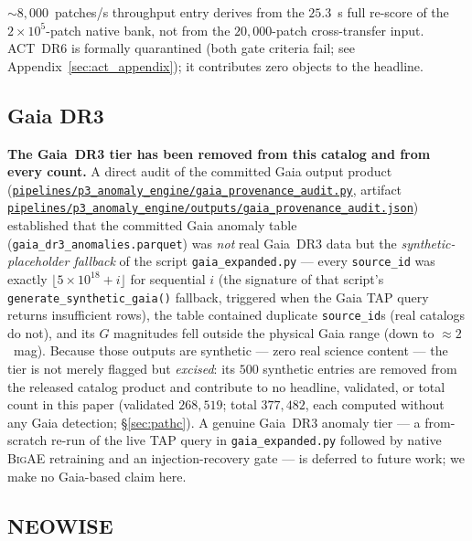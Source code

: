 \documentclass[aps,prd,twocolumn,superscriptaddress,showpacs,preprintnumbers,nofootinbib,longbibliography,floatfix]{revtex4-2}
\newcommand{\repoBase}{https://github.com/Hubify-Projects/bigbounce/blob/main}
\newcommand{\artifact}[1]{\href{\repoBase/#1}{\nolinkurl{#1}}}
\newcommand{\BigAE}{\textsc{BigAE}}
\begin{document}
${\sim}8{,}000$~patches/s throughput entry derives from the $25.3$~s full re-score of the $2\times10^{5}$-patch native bank, not from the $20{,}000$-patch cross-transfer input. ACT~DR6 is formally quarantined (both gate criteria fail; see Appendix~\ref{sec:act_appendix}); it contributes zero objects to the headline.


\subsection{Gaia DR3}\label{sec:gaia}

\textbf{The Gaia~DR3 tier has been removed from this catalog and from every count.} A direct audit of the committed Gaia output product (\artifact{pipelines/p3\_anomaly\_engine/gaia\_provenance\_audit.py}, artifact \artifact{pipelines/p3\_anomaly\_engine/outputs/gaia\_provenance\_audit.json}) established that the committed Gaia anomaly table (\texttt{gaia\_dr3\_anomalies.parquet}) was \emph{not} real Gaia~DR3 data but the \emph{synthetic-placeholder fallback} of the script \texttt{gaia\_expanded.py} --- every \texttt{source\_id} was exactly $\lfloor 5\times10^{18} + i\rfloor$ for sequential $i$ (the signature of that script's \texttt{generate\_synthetic\_gaia()} fallback, triggered when the Gaia TAP query returns insufficient rows), the table contained duplicate \texttt{source\_id}s (real catalogs do not), and its $G$ magnitudes fell outside the physical Gaia range (down to ${\approx}2$~mag). Because those outputs are synthetic --- zero real science content --- the tier is not merely flagged but \emph{excised}: its $500$ synthetic entries are removed from the released catalog product and contribute to no headline, validated, or total count in this paper (validated $268{,}519$; total $377{,}482$, each computed without any Gaia detection; \S\ref{sec:pathc}). A genuine Gaia~DR3 anomaly tier --- a from-scratch re-run of the live TAP query in \texttt{gaia\_expanded.py} followed by native \BigAE{} retraining and an injection-recovery gate --- is deferred to future work; we make no Gaia-based claim here.


\subsection{NEOWISE}\label{sec:neowise}
\end{document}
